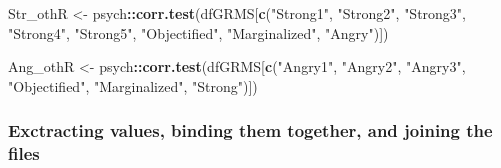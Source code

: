 \documentclass[
  english,
]{book}
\newenvironment{Shaded}{\begin{snugshade}}{\end{snugshade}}
\newcommand{\KeywordTok}[1]{\textcolor[rgb]{0.13,0.29,0.53}{\textbf{#1}}}
\newcommand{\NormalTok}[1]{#1}
\newcommand{\OperatorTok}[1]{\textcolor[rgb]{0.81,0.36,0.00}{\textbf{#1}}}
\newcommand{\StringTok}[1]{\textcolor[rgb]{0.31,0.60,0.02}{#1}}
\begin{document}
\begin{Shaded}
\begin{Highlighting}[]
\NormalTok{Str_othR <-}\StringTok{ }\NormalTok{psych}\OperatorTok{::}\KeywordTok{corr.test}\NormalTok{(dfGRMS[}\KeywordTok{c}\NormalTok{(}\StringTok{"Strong1"}\NormalTok{, }\StringTok{"Strong2"}\NormalTok{, }\StringTok{"Strong3"}\NormalTok{, }\StringTok{"Strong4"}\NormalTok{, }\StringTok{"Strong5"}\NormalTok{, }\StringTok{"Objectified"}\NormalTok{, }\StringTok{"Marginalized"}\NormalTok{, }\StringTok{"Angry"}\NormalTok{)])}
\end{Highlighting}
\end{Shaded}

\begin{Shaded}
\begin{Highlighting}[]
\NormalTok{Ang_othR <-}\StringTok{ }\NormalTok{psych}\OperatorTok{::}\KeywordTok{corr.test}\NormalTok{(dfGRMS[}\KeywordTok{c}\NormalTok{(}\StringTok{"Angry1"}\NormalTok{, }\StringTok{"Angry2"}\NormalTok{, }\StringTok{"Angry3"}\NormalTok{,  }\StringTok{"Objectified"}\NormalTok{, }\StringTok{"Marginalized"}\NormalTok{, }\StringTok{"Strong"}\NormalTok{)])}
\end{Highlighting}
\end{Shaded}

\hypertarget{exctracting-values-binding-them-together-and-joining-the-files}{%
\subsubsection{Exctracting values, binding them together, and joining the files}\label{exctracting-values-binding-them-together-and-joining-the-files}}
\end{document}
